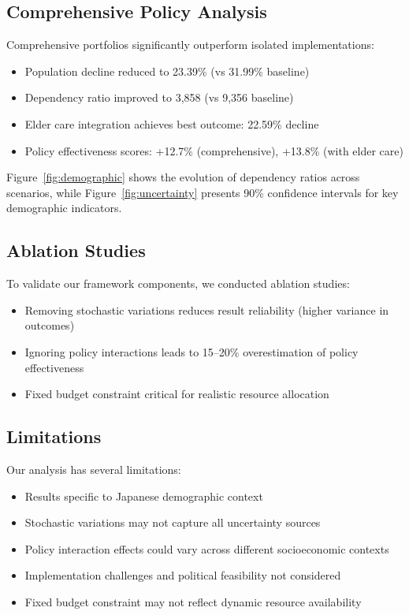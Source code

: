 \documentclass{article} %
\begin{document}
\subsection{Comprehensive Policy Analysis}
Comprehensive portfolios significantly outperform isolated implementations:
\begin{itemize}
    \item Population decline reduced to 23.39\% (vs 31.99\% baseline)
    \item Dependency ratio improved to 3,858 (vs 9,356 baseline)
    \item Elder care integration achieves best outcome: 22.59\% decline
    \item Policy effectiveness scores: +12.7\% (comprehensive), +13.8\% (with elder care)
\end{itemize}

Figure~\ref{fig:demographic} shows the evolution of dependency ratios across scenarios, while Figure~\ref{fig:uncertainty} presents 90\% confidence intervals for key demographic indicators.

\subsection{Ablation Studies}
To validate our framework components, we conducted ablation studies:
\begin{itemize}
    \item Removing stochastic variations reduces result reliability (higher variance in outcomes)
    \item Ignoring policy interactions leads to 15--20\% overestimation of policy effectiveness
    \item Fixed budget constraint critical for realistic resource allocation
\end{itemize}

\subsection{Limitations}
Our analysis has several limitations:
\begin{itemize}
    \item Results specific to Japanese demographic context
    \item Stochastic variations may not capture all uncertainty sources
    \item Policy interaction effects could vary across different socioeconomic contexts
    \item Implementation challenges and political feasibility not considered
    \item Fixed budget constraint may not reflect dynamic resource availability
\end{itemize}
\end{document}
